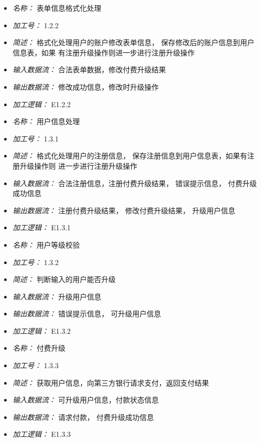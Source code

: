 \begin{itemize}
\item \textit{名称： } 表单信息格式化处理
\item \textit{加工号： } 1.2.2
\item \textit{简述： } 格式化处理用户的账户修改表单信息， 保存修改后的账户信息到用户信息表，如果 有注册升级操作则进一步进行注册升级操作
\item \textit{输入数据流： } 合法表单数据，修改付费升级结果
\item \textit{输出数据流： } 修改成功信息，修改时升级操作
\item \textit{加工逻辑： } E1.2.2

\end{itemize}


\vspace{-1mm}


\begin{itemize}
\item \textit{名称： } 用户信息处理
\item \textit{加工号： } 1.3.1
\item \textit{简述： } 格式化处理用户的注册信息， 保存注册信息到用户信息表，如果有注册升级操作则 进一步进行注册升级操作
\item \textit{输入数据流： } 合法注册信息，注册付费升级结果， 错误提示信息， 付费升级成功信息 
\item \textit{输出数据流： } 注册付费升级结果， 修改付费升级结果， 升级用户信息
\item \textit{加工逻辑： } E1.3.1

\end{itemize}


\vspace{-1mm}


\begin{itemize}
\item \textit{名称： } 用户等级校验
\item \textit{加工号： } 1.3.2
\item \textit{简述： } 判断输入的用户能否升级 
\item \textit{输入数据流： } 升级用户信息 
\item \textit{输出数据流： } 错误提示信息， 可升级用户信息
\item \textit{加工逻辑： } E1.3.2

\end{itemize}


\vspace{-1mm}


\begin{itemize}
\item \textit{名称： } 付费升级
\item \textit{加工号： } 1.3.3
\item \textit{简述： } 获取用户信息，向第三方银行请求支付，返回支付结果 
\item \textit{输入数据流： } 可升级用户信息，付款状态信息
\item \textit{输出数据流： } 请求付款， 付费升级成功信息
\item \textit{加工逻辑： } E1.3.3

\end{itemize}



